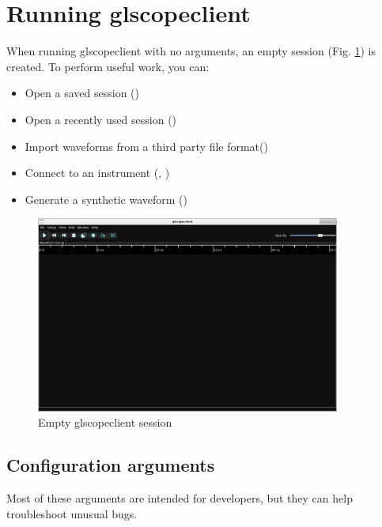 \section{Running glscopeclient}

When running glscopeclient with no arguments, an empty session (Fig. \ref{empty-window}) is created. To perform useful
work, you can:
\begin{itemize}
\item Open a saved session ()
\item Open a recently used session ()
\item Import waveforms from a third party file format()
\item Connect to an instrument (, )
\item Generate a synthetic waveform ()
\end{itemize}

\begin{figure}[h]
\centering
\includegraphics[width=10cm]{images/empty-window.png}
\caption{Empty glscopeclient session}
\label{empty-window}
\end{figure}

\subsection{Configuration arguments}

Most of these arguments are intended for developers, but they can help troubleshoot unusual bugs.

